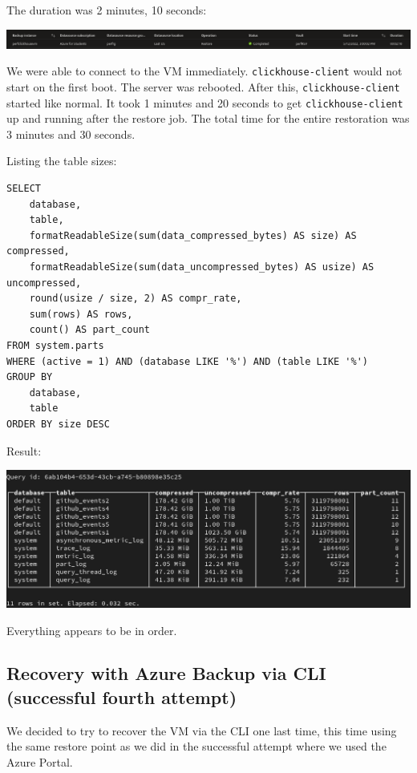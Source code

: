 The duration was 2 minutes, 10 seconds:
\begin{center}
\includegraphics[width=.9\linewidth]{figures/clickhouse/ab_restore2_duration.png}
\end{center}

We were able to connect to the VM immediately.
\texttt{clickhouse-client} would not start on the first boot.
The server was rebooted.
After this, \texttt{clickhouse-client} started like normal.
It took 1 minutes and 20 seconds to get \texttt{clickhouse-client} up and running after the restore job.
The total time for the entire restoration was 3 minutes and 30 seconds.

Listing the table sizes:
\begin{verbatim}
SELECT
    database,
    table,
    formatReadableSize(sum(data_compressed_bytes) AS size) AS compressed,
    formatReadableSize(sum(data_uncompressed_bytes) AS usize) AS uncompressed,
    round(usize / size, 2) AS compr_rate,
    sum(rows) AS rows,
    count() AS part_count
FROM system.parts
WHERE (active = 1) AND (database LIKE '%') AND (table LIKE '%')
GROUP BY
    database,
    table
ORDER BY size DESC
\end{verbatim}

Result:
\begin{center}
\includegraphics[width=.9\linewidth]{figures/clickhouse/ab_restore2_tables.png}
\end{center}

Everything appears to be in order.

\subsection{Recovery with Azure Backup via CLI (successful fourth attempt)}
\label{sec:orgcd90f70}
We decided to try to recover the VM via the CLI one last time,
this time using the same restore point as we did in the successful
attempt where we used the Azure Portal.

